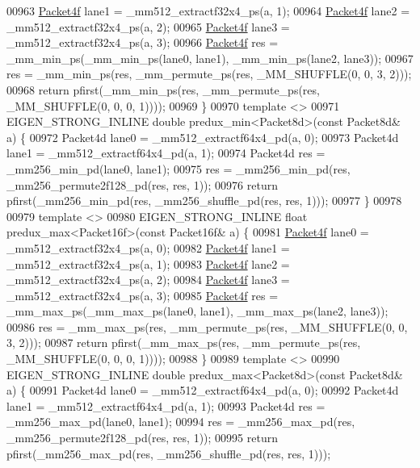 \begin{DoxyCode}
00963   \hyperlink{struct_eigen_1_1internal_1_1_packet4f}{Packet4f} lane1 = \_mm512\_extractf32x4\_ps(a, 1);
00964   \hyperlink{struct_eigen_1_1internal_1_1_packet4f}{Packet4f} lane2 = \_mm512\_extractf32x4\_ps(a, 2);
00965   \hyperlink{struct_eigen_1_1internal_1_1_packet4f}{Packet4f} lane3 = \_mm512\_extractf32x4\_ps(a, 3);
00966   \hyperlink{struct_eigen_1_1internal_1_1_packet4f}{Packet4f} res = \_mm\_min\_ps(\_mm\_min\_ps(lane0, lane1), \_mm\_min\_ps(lane2, lane3));
00967   res = \_mm\_min\_ps(res, \_mm\_permute\_ps(res, \_MM\_SHUFFLE(0, 0, 3, 2)));
00968   \textcolor{keywordflow}{return} pfirst(\_mm\_min\_ps(res, \_mm\_permute\_ps(res, \_MM\_SHUFFLE(0, 0, 0, 1))));
00969 \}
00970 \textcolor{keyword}{template} <>
00971 EIGEN\_STRONG\_INLINE \textcolor{keywordtype}{double} predux\_min<Packet8d>(\textcolor{keyword}{const} Packet8d& a) \{
00972   Packet4d lane0 = \_mm512\_extractf64x4\_pd(a, 0);
00973   Packet4d lane1 = \_mm512\_extractf64x4\_pd(a, 1);
00974   Packet4d res = \_mm256\_min\_pd(lane0, lane1);
00975   res = \_mm256\_min\_pd(res, \_mm256\_permute2f128\_pd(res, res, 1));
00976   \textcolor{keywordflow}{return} pfirst(\_mm256\_min\_pd(res, \_mm256\_shuffle\_pd(res, res, 1)));
00977 \}
00978 
00979 \textcolor{keyword}{template} <>
00980 EIGEN\_STRONG\_INLINE \textcolor{keywordtype}{float} predux\_max<Packet16f>(\textcolor{keyword}{const} Packet16f& a) \{
00981   \hyperlink{struct_eigen_1_1internal_1_1_packet4f}{Packet4f} lane0 = \_mm512\_extractf32x4\_ps(a, 0);
00982   \hyperlink{struct_eigen_1_1internal_1_1_packet4f}{Packet4f} lane1 = \_mm512\_extractf32x4\_ps(a, 1);
00983   \hyperlink{struct_eigen_1_1internal_1_1_packet4f}{Packet4f} lane2 = \_mm512\_extractf32x4\_ps(a, 2);
00984   \hyperlink{struct_eigen_1_1internal_1_1_packet4f}{Packet4f} lane3 = \_mm512\_extractf32x4\_ps(a, 3);
00985   \hyperlink{struct_eigen_1_1internal_1_1_packet4f}{Packet4f} res = \_mm\_max\_ps(\_mm\_max\_ps(lane0, lane1), \_mm\_max\_ps(lane2, lane3));
00986   res = \_mm\_max\_ps(res, \_mm\_permute\_ps(res, \_MM\_SHUFFLE(0, 0, 3, 2)));
00987   \textcolor{keywordflow}{return} pfirst(\_mm\_max\_ps(res, \_mm\_permute\_ps(res, \_MM\_SHUFFLE(0, 0, 0, 1))));
00988 \}
00989 \textcolor{keyword}{template} <>
00990 EIGEN\_STRONG\_INLINE \textcolor{keywordtype}{double} predux\_max<Packet8d>(\textcolor{keyword}{const} Packet8d& a) \{
00991   Packet4d lane0 = \_mm512\_extractf64x4\_pd(a, 0);
00992   Packet4d lane1 = \_mm512\_extractf64x4\_pd(a, 1);
00993   Packet4d res = \_mm256\_max\_pd(lane0, lane1);
00994   res = \_mm256\_max\_pd(res, \_mm256\_permute2f128\_pd(res, res, 1));
00995   \textcolor{keywordflow}{return} pfirst(\_mm256\_max\_pd(res, \_mm256\_shuffle\_pd(res, res, 1)));

\end{DoxyCode}
